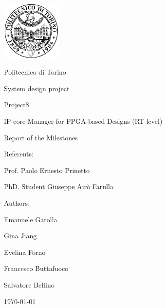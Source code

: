 \documentclass[10pt,  english, makeidx, a4paper, titlepage, oneside]{book}
\begin{document}
\frontmatter
\begin{titlepage}
\vspace{0cm}
\centerline{
\includegraphics[width=3cm]{./logopoli}} 
\vspace{0.5cm}
\centerline{\LARGE Politecnico di Torino}
\vspace{2cm}
\centerline{\Huge\sf System design project}
\vspace{1.5cm}
\centerline{\huge \sf Project8 }
\bigskip
\centerline{\huge\sf IP-core Manager for FPGA-based Designs (RT level)}
\vspace{1.2cm}
\centerline{\huge\sf Report of the Milestones}
\vspace{1.5cm}
\bigskip
\vspace{0.5cm}
%
\centerline{\large Referents: }
\centerline{\large Prof. Paolo Ernesto Prinetto}
\centerline{\large PhD. Student Giuseppe Air\`{o} Farulla}
\bigskip
\vspace{1cm}
%
%
\centerline{\large Authors:}
\bigskip
%
%
\centerline{\large Emanuele Garolla}
\centerline{\large Gina Jiang}
\centerline{\large Evelina Forno}
\centerline{\large Francesco Buttafuoco}
\centerline{\large Salvatore Bellino}
%
\vspace{2cm}
\centerline{\large \monthyeardate\today}
\end{titlepage}
 
\newenvironment{acknowledgements}%
{\cleardoublepage\thispagestyle{empty}\null\vfill\begin{center}%
		\bfseries\textbf{ \huge Acknowledgements}\end{center}}%
{\vfill\null}




\mainmatter
%    
%
%

% 
%
%    
%
%
% 
%
\end{document}
